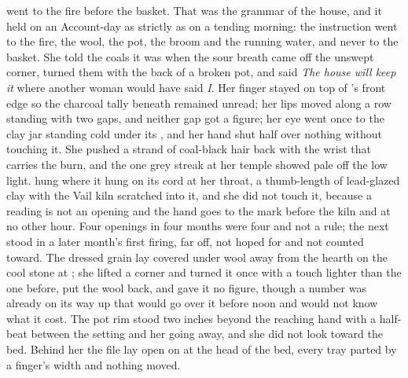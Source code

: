  went to the fire before the basket. That was the grammar of the house, and it held on an Account-day as strictly as on a tending morning: the instruction went to the fire, the wool, the pot, the broom and the running water, and never to the basket. She told the coals it was  when the sour breath came off the unswept corner, turned them with the back of a broken pot, and said \emph{The house will keep it} where another woman would have said \emph{I}. Her finger stayed on top of 's front edge so the charcoal tally beneath remained unread; her lips moved along a row standing with two gaps, and neither gap got a figure; her eye went once to the clay jar standing cold under its , and her hand shut half over nothing without touching it. She pushed a strand of coal-black hair back with the wrist that carries the burn, and the one grey streak at her temple showed pale off the low light.  hung where it hung on its cord at her throat, a thumb-length of lead-glazed clay with the Vail kiln scratched into it, and she did not touch it, because a reading is not an opening and the hand goes to the mark before the kiln and at no other hour. Four openings in four months were four and not a rule; the next stood in a later month's first firing, far off, not hoped for and not counted toward. The dressed grain lay covered under wool away from the hearth on the cool stone at ; she lifted a corner and turned it once with a touch lighter than the one before, put the wool back, and gave it no figure, though a number was already on its way up  that would go over it before noon and would not know what it cost. The pot rim stood two inches beyond the reaching hand with a half-beat between the setting and her going away, and she did not look toward the bed. Behind her the file lay open on  at the head of the bed, every tray parted by a finger's width and nothing moved.

